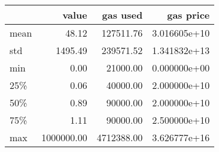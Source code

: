 \begin{tabular}{lrrr}
\toprule
{} &       value &    gas used &     gas price \\
\midrule
mean &       48.12 &   127511.76 &  3.016605e+10 \\
std  &     1495.49 &   239571.52 &  1.341832e+13 \\
min  &        0.00 &    21000.00 &  0.000000e+00 \\
25\%  &        0.06 &    40000.00 &  2.000000e+10 \\
50\%  &        0.89 &    90000.00 &  2.000000e+10 \\
75\%  &        1.11 &    90000.00 &  2.500000e+10 \\
max  &  1000000.00 &  4712388.00 &  3.626777e+16 \\
\bottomrule
\end{tabular}
